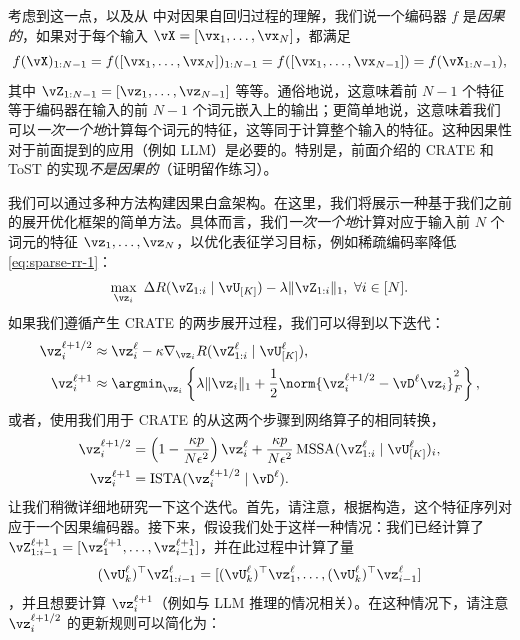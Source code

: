 \documentclass[../../book-main_zh.tex]{subfiles}
\begin{document}
考虑到这一点，以及从  中对因果自回归过程的理解，我们说一个编码器 \(f\) 是\textit{因果的}，如果对于每个输入 \(\vX = [\vx_{1}, \dots, \vx_{N}]\)，都满足
\begin{equation}
    f(\vX)_{1:N-1} = f([\vx_{1}, \dots, \vx_{N}])_{1:N-1} =
    f([\vx_{1}, \dots, \vx_{N - 1}]) = f(\vX_{1:N-1}),
\end{equation}
其中 \(\vZ_{1:N-1} = [\vz_{1}, \dots, \vz_{N-1}]\) 等等。通俗地说，这意味着前 \(N-1\) 个特征等于编码器在输入的前 \(N-1\) 个词元嵌入上的输出；更简单地说，这意味着我们可以\textit{一次一个地}计算每个词元的特征，这等同于计算整个输入的特征。这种因果性对于前面提到的应用（例如 LLM）是必要的。特别是，前面介绍的 CRATE 和 ToST 的实现\textit{不是因果的}（证明留作练习）。

我们可以通过多种方法构建因果白盒架构。在这里，我们将展示一种基于我们之前的展开优化框架的简单方法。具体而言，我们\textit{一次一个地}计算对应于输入前 \(N\) 个词元的特征 \(\vz_{1}, \dots, \vz_{N}\)，以优化表征学习目标，例如稀疏编码率降低 \eqref{eq:sparse-rr-1}：
\begin{equation}
    \max_{\vz_{i}}\ \Delta R(\vZ_{1:i} \mid \vU_{[K]}) - \lambda
    \|\vZ_{1:i}\|_{1},\ \forall i \in [N].
\end{equation}
如果我们遵循产生 CRATE 的两步展开过程，我们可以得到以下迭代：
\begin{align}
    \vz_{i}^{\ell + 1/2} &\approx \vz_{i}^{\ell} - \kappa
    \nabla_{\vz_{i}} R(\vZ_{1:i}^{\ell} \mid \vU_{[K]}^{\ell}), \\
    \vz_{i}^{\ell + 1} &\approx \argmin_{\vz_{i}} \left\{\lambda
        \|\vz_{i}\|_{1} + \frac{1}{2}\norm{\vz_{i}^{\ell + 1/2} -
    \vD^{\ell} {\vz_{i}}}_F^2\right\},
\end{align}
或者，使用我们用于 CRATE 的从这两个步骤到网络算子的相同转换，
\begin{align}
    \vz_{i}^{\ell + 1/2}
    &= \left(1 - \frac{\kappa p}{N\epsilon^{2}}\right)\vz_{i}^{\ell}
    + \frac{\kappa p}{N
    \epsilon^{2}}\operatorname{MSSA}(\vZ_{1:i}^{\ell} \mid
    \vU_{[K]}^{\ell})_{i}, \\
    \vz_{i}^{\ell + 1}
    &= \operatorname{ISTA}(\vz_{i}^{\ell + 1/2} \mid \vD^{\ell}).
\end{align}
让我们稍微详细地研究一下这个迭代。首先，请注意，根据构造，这个特征序列对应于一个因果编码器。接下来，假设我们处于这样一种情况：我们已经计算了 \(\vZ_{1:i-1}^{\ell + 1} = [\vz_{1}^{\ell +
1}, \dots, \vz_{i-1}^{\ell + 1}]\)，并在此过程中计算了量
\[(\vU_{k}^{\ell})^{\top}\vZ_{1:i-1}^{\ell} =
    [(\vU_{k}^{\ell})^{\top}\vz_{1}^{\ell}, \dots,
(\vU_{k}^{\ell})^{\top}\vz_{i-1}^{\ell}]\]，并且想要计算 \(\vz_{i}^{\ell + 1}\)（例如与 LLM 推理的情况相关）。在这种情况下，请注意 \(\vz_{i}^{\ell + 1/2}\) 的更新规则可以简化为：
\end{document}
